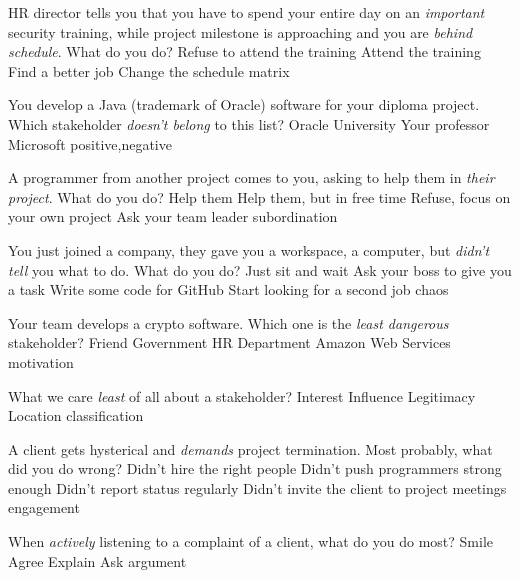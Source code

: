 \documentclass{article}
\begin{document}

\pmbaQuestion
  {HR director tells you that you have to spend your entire day on an \emph{important} security training, while project milestone is approaching and you are \emph{behind schedule}. What do you do?}
  {Refuse to attend the training}
  {Attend the training}
  {Find a better job}
  {Change the schedule}
  {matrix}

\pmbaQuestion
  {You develop a Java (trademark of Oracle) software for your diploma project. Which stakeholder \emph{doesn't belong} to this list?}
  {Oracle}
  {University}
  {Your professor}
  {Microsoft}
  {positive,negative}

\pmbaQuestion
  {A programmer from another project comes to you, asking to help them in \emph{their project}. What do you do?}
  {Help them}
  {Help them, but in free time}
  {Refuse, focus on your own project}
  {Ask your team leader}
  {subordination}

\pmbaQuestion
  {You just joined a company, they gave you a workspace, a computer, but \emph{didn't tell} you what to do. What do you do?}
  {Just sit and wait}
  {Ask your boss to give you a task}
  {Write some code for GitHub}
  {Start looking for a second job}
  {chaos}

\pmbaQuestion
  {Your team develops a crypto software. Which one is the \emph{least dangerous} stakeholder?}
  {Friend}
  {Government}
  {HR Department}
  {Amazon Web Services}
  {motivation}

\pmbaQuestion
  {What we care \emph{least} of all about a stakeholder?}
  {Interest}
  {Influence}
  {Legitimacy}
  {Location}
  {classification}

\pmbaQuestion
  {A client gets hysterical and \emph{demands} project termination. Most probably, what did you do wrong?}
  {Didn't hire the right people}
  {Didn't push programmers strong enough}
  {Didn't report status regularly}
  {Didn't invite the client to project meetings}
  {engagement}

\pmbaQuestion
  {When \emph{actively} listening to a complaint of a client, what do you do most?}
  {Smile}
  {Agree}
  {Explain}
  {Ask}
  {argument}


\end{document}
